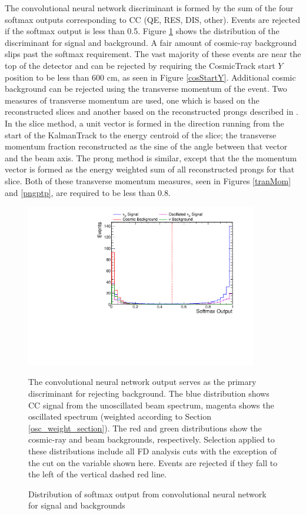 The convolutional neural network discriminant is formed by the sum of the four
softmax outputs corresponding to \numu CC (QE, RES, DIS, other).
Events are rejected if the softmax output is less than 0.5.
Figure \ref{cvnnumu} shows the distribution of the discriminant for
signal and background.
A fair amount of cosmic-ray background slips past the softmax requirement.
The vast majority of these events are near the top of the detector
and can be rejected by requiring the CosmicTrack start $Y$ position to be less
than 600 cm, as seen in Figure \ref{cosStartY}.
Additional cosmic background can be rejected using the transverse momentum
of the event.
Two measures of transverse momentum are used, one which is based
on the reconstructed slices and another based on the reconstructed prongs
described in \cite{niner2015thesis}.
In the slice method, a unit vector is formed in the direction running
from the start of the KalmanTrack to the energy centroid of the slice;
the transverse momentum fraction reconstructed as the sine of the angle
between that vector and the beam axis.
The prong method is similar, except that the the momentum vector
is formed as the energy weighted sum of all reconstructed prongs
for that slice.
Both of these transverse momentum measures, seen in Figures \ref{tranMom} and
\ref{pngptp}, are required to be less than 0.8.



\begin{figure}
\begin{center}
\includegraphics[width=0.9\textwidth]{figures/selection/n1_cvnnumu.pdf}
\end{center}
\caption{Distribution of softmax output from convolutional neural network for signal and backgrounds}{
The convolutional neural network output serves as the primary discriminant for
rejecting background.
The blue distribution shows \numu CC signal from the unoscillated beam spectrum,
magenta shows the oscillated spectrum (weighted according to Section
\ref{osc_weight_section}).
The red and green distributions show the cosmic-ray and beam backgrounds,
respectively.
Selection applied to these distributions include all FD analysis cuts
with the exception of the cut on the variable shown here.
Events are rejected if they fall to the left of the vertical
dashed red line.
}
\label{cvnnumu}
\end{figure}


